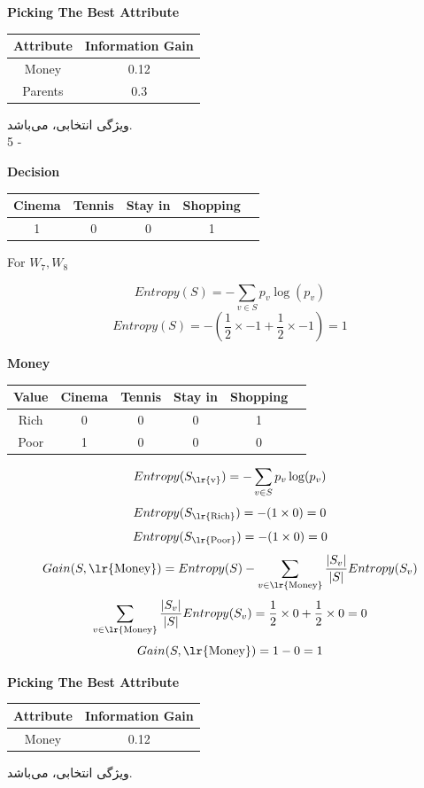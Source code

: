 \documentclass{article}
\newcommand{\tf}[1]{\text{\lr{#1}}}
\begin{document}
	\begin{latin}
		\textbf{Picking The Best Attribute}
		\begin{center}
			\begin{tabular}{|c|c|}
				\hline
				Attribute & Information Gain\\
				\hline
				\hline
				Money & 0.12\\
				Parents & 0.3\\
				\hline
			\end{tabular}
		\end{center}
	\end{latin}
	ویژگی انتخابی،
	می‌باشد.\\
	5 - 
	\begin{latin}
		\textbf{Decision}
		\begin{center}
			\begin{tabular}{|c|c|c|c|c|}
				\hline
				Cinema & Tennis & Stay in & Shopping\\
				\hline
				\hline
				1 & 0 & 0 & 1\\
				\hline
			\end{tabular}
		\end{center}
		For $W_7, W_8$
	\end{latin}
	\vspace{5pt}
	\[
	Entropy(S) = -\sum_{v \in S} p_v\log (p_v)
	\]
	\[
	Entropy(S) = -( \frac{1}{2} \times -1 + \frac{1}{2} \times -1) = 1
	\]
	\begin{latin}
		\textbf{Money}
		\begin{center}
			\begin{tabular}{|c|c|c|c|c|c|}
				\hline
				Value & Cinema & Tennis & Stay in & Shopping\\
				\hline
				\hline
				Rich & 0 & 0 & 0 & 1\\
				\hline
				Poor & 1 & 0 & 0 & 0\\
				\hline
			\end{tabular}
		\end{center}
	\end{latin}
	\vspace{5pt}
	\[
	Entropy(S_{\text{\lr{v}}}) = -\sum_{v \in S} p_v\log (p_v)
	\]
	\[
	Entropy(S_{\tf{Rich}}) = -( 1 \times 0 ) = 0
	\]
	\[
	Entropy(S_{\tf{Poor}}) = -( 1 \times 0 ) = 0
	\]
	\vspace{10pt}
	\[
	Gain(S, \tf{Money}) = Entropy(S) - \sum_{v \in \tf{Money}} \frac{| S_v |}{| S |}Entropy(S_v)
	\] 
	\[
	\sum_{v \in \tf{Money}} \frac{| S_v |}{| S |}Entropy(S_v) = \frac{1}{2} \times 0 + \frac{1}{2} \times 0 = 0
	\]
	\[
	Gain(S, \tf{Money}) = 1 - 0 = 1
	\]
	\begin{latin}
		\textbf{Picking The Best Attribute}
		\begin{center}
			\begin{tabular}{|c|c|}
				\hline
				Attribute & Information Gain\\
				\hline
				\hline
				Money & 0.12\\
				\hline
			\end{tabular}
		\end{center}
	\end{latin}
	ویژگی انتخابی،
	می‌باشد.\\
	
\end{document}
